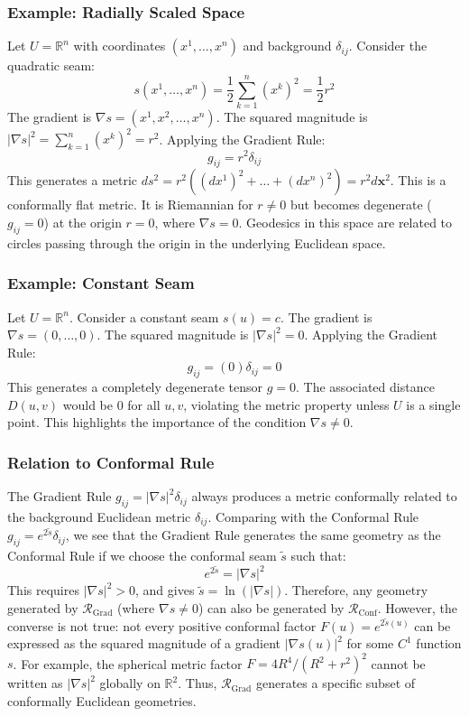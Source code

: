 \documentclass[twoside,twocolumn]{article}
\numberwithin{equation}{section} %
\begin{document}
\subsubsection{Example: Radially Scaled Space}
Let $U = \mathbb{R}^n$ with coordinates $(x^1, \dots, x^n)$ and background $\delta_{ij}$. Consider the quadratic seam:
$$ s(x^1, \dots, x^n) = \frac{1}{2} \sum_{k=1}^n (x^k)^2 = \frac{1}{2} r^2 $$
The gradient is $\nabla s = (x^1, x^2, \dots, x^n)$. The squared magnitude is $|\nabla s|^2 = \sum_{k=1}^n (x^k)^2 = r^2$. Applying the Gradient Rule:
$$ g_{ij} = r^2 \delta_{ij} $$
This generates a metric $ds^2 = r^2 ( (dx^1)^2 + \dots + (dx^n)^2 ) = r^2 d\mathbf{x}^2$. This is a conformally flat metric. It is Riemannian for $r \neq 0$ but becomes degenerate ($g_{ij}=0$) at the origin $r=0$, where $\nabla s = 0$. Geodesics in this space are related to circles passing through the origin in the underlying Euclidean space.

\subsubsection{Example: Constant Seam}
Let $U = \mathbb{R}^n$. Consider a constant seam $s(u) = c$.
The gradient is $\nabla s = (0, \dots, 0)$. The squared magnitude is $|\nabla s|^2 = 0$. Applying the Gradient Rule:
$$ g_{ij} = (0) \delta_{ij} = 0 $$
This generates a completely degenerate tensor $g=0$. The associated distance $D(u, v)$ would be 0 for all $u, v$, violating the metric property unless $U$ is a single point. This highlights the importance of the condition $\nabla s \neq 0$.

\subsubsection{Relation to Conformal Rule}
The Gradient Rule $g_{ij} = |\nabla s|^2 \delta_{ij}$ always produces a metric conformally related to the background Euclidean metric $\delta_{ij}$. Comparing with the Conformal Rule $g_{ij} = e^{2\tilde{s}} \delta_{ij}$, we see that the Gradient Rule generates the same geometry as the Conformal Rule if we choose the conformal seam $\tilde{s}$ such that:
$$ e^{2\tilde{s}} = |\nabla s|^2 $$
This requires $|\nabla s|^2 > 0$, and gives $\tilde{s} = \ln(|\nabla s|)$. Therefore, any geometry generated by $\mathcal{R}_{\text{Grad}}$ (where $\nabla s \neq 0$) can also be generated by $\mathcal{R}_{\text{Conf}}$. However, the converse is not true: not every positive conformal factor $F(u) = e^{2\tilde{s}(u)}$ can be expressed as the squared magnitude of a gradient $|\nabla s(u)|^2$ for some $C^1$ function $s$. For example, the spherical metric factor $F = 4R^4 / (R^2+r^2)^2$ cannot be written as $|\nabla s|^2$ globally on $\mathbb{R}^2$. Thus, $\mathcal{R}_{\text{Grad}}$ generates a specific subset of conformally Euclidean geometries.
\end{document}
